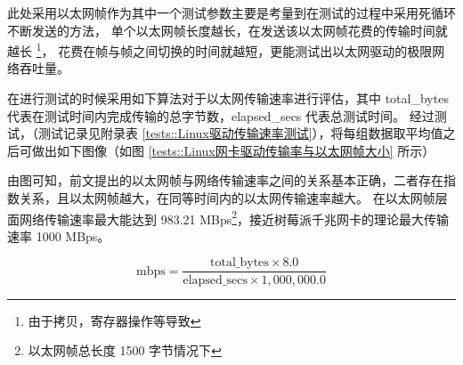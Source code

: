     此处采用以太网帧作为其中一个测试参数主要是考量到在测试的过程中采用死循环不断发送的方法，
    单个以太网帧长度越长，在发送该以太网帧花费的传输时间就越长
    \footnote{由于拷贝，寄存器操作等导致}，
    花费在帧与帧之间切换的时间就越短，更能测试出以太网驱动的极限网络吞吐量。

    在进行测试的时候采用如下算法对于以太网传输速率进行评估，其中 total\_bytes 代表在测试时间内完成传输的总字节数，elapsed\_secs 代表总测试时间。
    经过测试，（测试记录见附录表 \ref{tests::Linux驱动传输速率测试}），将每组数据取平均值之后可做出如下图像（如图 \ref{tests::Linux网卡驱动传输率与以太网帧大小} 所示）

    由图可知，前文提出的以太网帧与网络传输速率之间的关系基本正确，二者存在指数关系，且以太网帧越大，在同等时间内的以太网传输速率越大。
    在以太网帧层面网络传输速率最大能达到 983.21 MBps\footnote{以太网帧总长度 1500 字节情况下}，接近树莓派千兆网卡的理论最大传输速率 1000 MBps。

    $$\text{mbps} = \frac{\text{total\_bytes} \times 8.0}{\text{elapsed\_secs} \times 1,000,000.0}$$

        \label{tests::Linux网卡驱动传输率与以太网帧大小}



